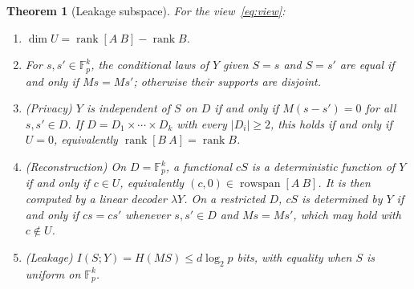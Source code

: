 \documentclass[pdflatex,sn-mathphys-num]{sn-jnl}
\theoremstyle{plain}
\newtheorem{theorem}{Theorem}
\theoremstyle{definition}
\newcommand{\F}{\mathbb{F}}
\newcommand{\rk}{\operatorname{rank}}
\begin{document}
\begin{theorem}[Leakage subspace]\label{thm:leakage}
For the view~\eqref{eq:view}:
\begin{enumerate}
\item $\dim U=\rk[A\ B]-\rk B$.
\item For $s,s'\in\F_p^k$, the conditional laws of $Y$ given $S=s$ and $S=s'$ are equal if and only if $Ms=Ms'$; otherwise their supports are disjoint.
\item (Privacy) $Y$ is independent of $S$ on $D$ if and only if $M(s-s')=0$ for all $s,s'\in D$. If $D=D_1\times\cdots\times D_k$ with every $|D_i|\ge2$, this holds if and only if $U=0$, equivalently $\rk[B\ A]=\rk B$.
\item (Reconstruction) On $D=\F_p^k$, a functional $cS$ is a deterministic function of $Y$ if and only if $c\in U$, equivalently $(c,0)\in\operatorname{rowspan}[A\ B]$. It is then computed by a linear decoder $\lambda Y$. On a restricted $D$, $cS$ is determined by $Y$ if and only if $cs=cs'$ whenever $s,s'\in D$ and $Ms=Ms'$, which may hold with $c\notin U$.
\item (Leakage) $I(S;Y)=H(MS)\le d\log_2p$ bits, with equality when $S$ is uniform on $\F_p^k$.
\end{enumerate}
\end{theorem}
\end{document}
